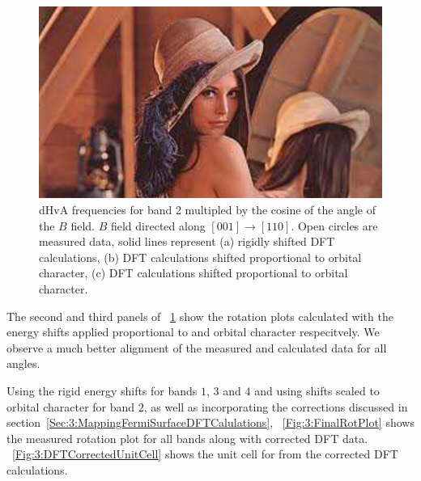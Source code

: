 \begin{figure}[h!]
    \begin{center}
        \includegraphics[scale=0.7]{Misc/TODO}
        \caption{dHvA frequencies for band 2 multipled by the cosine of the angle of the $B$ field. $B$ field directed along $[001]\rightarrow[110]$. Open circles are measured data, solid lines represent (a) rigidly shifted DFT calculations, (b) DFT calculations shifted proportional to \DzTwo orbital character, (c) DFT calculations shifted proportional to \DxzDyz orbital character.}
        \label{Fig:3:Band2DCharacterRigidComparison}
    \end{center}
\end{figure}

The second and third panels of \fig~\ref{Fig:3:Band2DCharacterRigidComparison} show the rotation plots calculated with the energy shifts applied proportional to \DzTwo and \DxzDyz orbital character respecitvely. We observe a much better alignment of the measured and calculated data for all angles.

Using the rigid energy shifts for bands $1$, $3$ and $4$ and using shifts scaled to \DzTwo orbital character for band $2$, as well as incorporating the corrections discussed in section~\ref{Sec:3:MappingFermiSurfaceDFTCalulations}, \fig~\ref{Fig:3:FinalRotPlot} shows the measured rotation plot for all bands along with corrected DFT data. \Fig~\ref{Fig:3:DFTCorrectedUnitCell} shows the unit cell for \BaFeP from the corrected DFT calculations.

